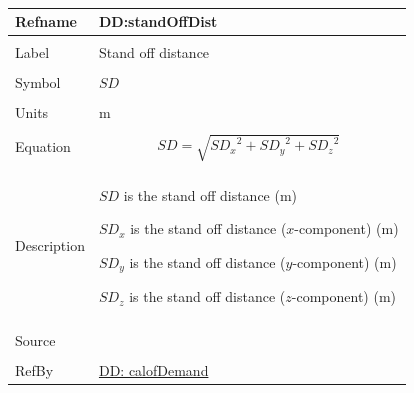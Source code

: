 \documentclass[12pt]{article}
\begin{document}
\par~

\noindent \begin{minipage}{\textwidth}
\begin{tabular}{p{} p{}}
\toprule \textbf{Refname} & \textbf{DD:standOffDist}
\label{DD:standOffDist}
\\ \midrule \\
Label & Stand off distance
\\ \midrule \\
Symbol & $SD$
\\ \midrule \\
Units & m
\\ \midrule \\
Equation & \begin{displaymath}
           SD=\sqrt{{SD_{x}}^{2}+{SD_{y}}^{2}+{SD_{z}}^{2}}
           \end{displaymath}
\\ \midrule \\
Description & \begin{symbDescription}
              \item{$SD$ is the stand off distance (m)}
              \item{${SD_{x}}$ is the stand off distance ($x$-component) (m)}
              \item{${SD_{y}}$ is the stand off distance ($y$-component) (m)}
              \item{${SD_{z}}$ is the stand off distance ($z$-component) (m)}
              \end{symbDescription}
\\ \midrule \\
Source & \cite{astm2009}
\\ \midrule \\
RefBy & \hyperref[DD:calofDemand]{DD: calofDemand}
\\ \bottomrule \end{tabular}
\end{minipage}
\par~
\end{document}
